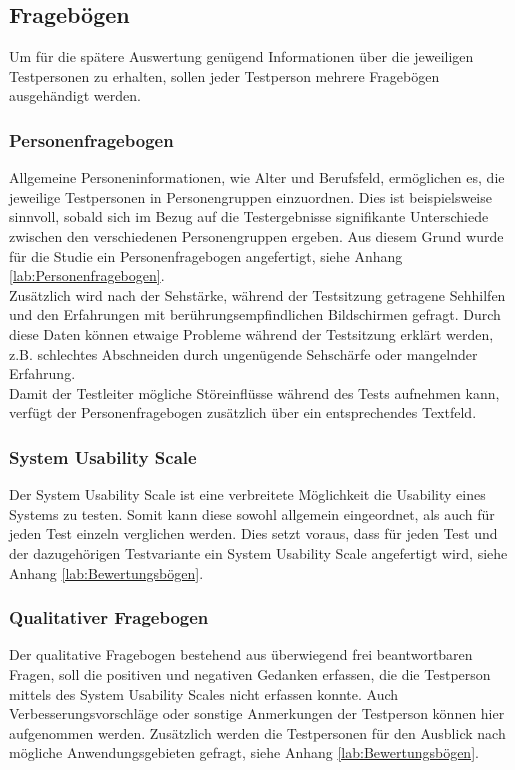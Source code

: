 \documentclass[12pt,bibliography=totocnumbered,listof=totocnumbered,abstracton]{scrreprt}
\begin{document}
\subsection{Fragebögen}
Um für die spätere Auswertung genügend Informationen über die jeweiligen Testpersonen zu erhalten, sollen jeder Testperson mehrere Fragebögen ausgehändigt werden.

\subsubsection{Personenfragebogen}
Allgemeine Personeninformationen, wie Alter und Berufsfeld, ermöglichen es, die jeweilige Testpersonen in Personengruppen einzuordnen. Dies ist beispielsweise sinnvoll, sobald sich im Bezug auf die Testergebnisse signifikante Unterschiede zwischen den verschiedenen Personengruppen ergeben. Aus diesem Grund wurde für die Studie ein Personenfragebogen angefertigt, siehe Anhang \ref{lab:Personenfragebogen}.\\
Zusätzlich wird nach der Sehstärke, während der Testsitzung getragene Sehhilfen und den Erfahrungen mit berührungsempfindlichen Bildschirmen gefragt. Durch diese Daten können etwaige Probleme während der Testsitzung erklärt werden, z.B. schlechtes Abschneiden durch ungenügende Sehschärfe oder mangelnder Erfahrung.\\
Damit der Testleiter mögliche Störeinflüsse während des Tests aufnehmen kann, verfügt der Personenfragebogen zusätzlich über ein entsprechendes Textfeld.

\subsubsection{System Usability Scale}
Der System Usability Scale \citep{sus} ist eine verbreitete Möglichkeit die Usability eines Systems zu testen. Somit kann diese sowohl allgemein eingeordnet, als auch für jeden Test einzeln verglichen werden. Dies setzt voraus, dass für jeden Test und der dazugehörigen Testvariante ein System Usability Scale angefertigt wird, siehe Anhang \ref{lab:Bewertungsbögen}.

\subsubsection{Qualitativer Fragebogen}
Der qualitative Fragebogen bestehend aus überwiegend frei beantwortbaren Fragen, soll die positiven und negativen Gedanken erfassen, die die Testperson mittels des System Usability Scales nicht erfassen konnte. Auch Verbesserungsvorschläge oder sonstige Anmerkungen der Testperson können hier aufgenommen werden. Zusätzlich werden die Testpersonen für den Ausblick nach mögliche Anwendungsgebieten gefragt, siehe Anhang \ref{lab:Bewertungsbögen}.
\end{document}
